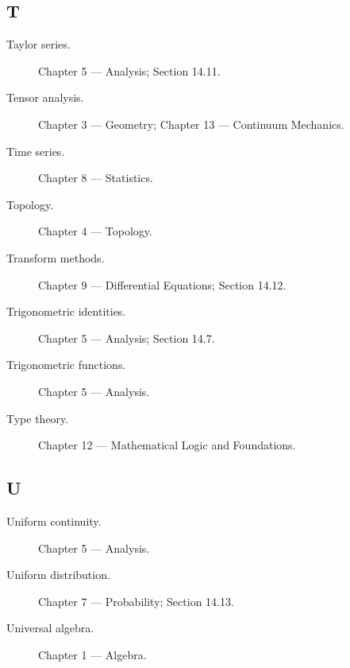\subsection*{T}

\begin{description}

\item[Taylor series.]
Chapter 5 --- Analysis;
Section 14.11.

\item[Tensor analysis.]
Chapter 3 --- Geometry;
Chapter 13 --- Continuum Mechanics.

\item[Time series.]
Chapter 8 --- Statistics.

\item[Topology.]
Chapter 4 --- Topology.

\item[Transform methods.]
Chapter 9 --- Differential Equations;
Section 14.12.

\item[Trigonometric identities.]
Chapter 5 --- Analysis;
Section 14.7.

\item[Trigonometric functions.]
Chapter 5 --- Analysis.

\item[Type theory.]
Chapter 12 --- Mathematical Logic and Foundations.

\end{description}

\subsection*{U}

\begin{description}

\item[Uniform continuity.]
Chapter 5 --- Analysis.

\item[Uniform distribution.]
Chapter 7 --- Probability;
Section 14.13.

\item[Universal algebra.]
Chapter 1 --- Algebra.

\end{description}

